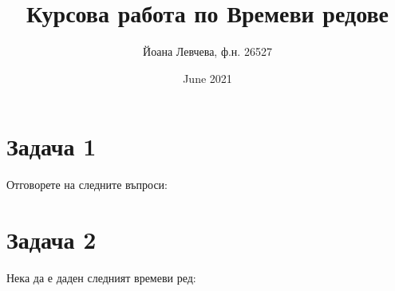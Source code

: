 \documentclass{article}
\title{Курсова работа по Времеви редове}
\author{Йоана Левчева, ф.н. 26527}
\date{June 2021}
\begin{document}
\maketitle

\section*{Задача 1}
Отговорете на следните въпроси:

\section*{Задача 2}
Нека да е даден следният времеви ред:
\end{document}
